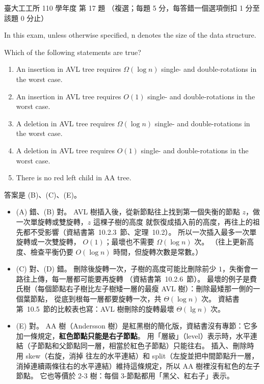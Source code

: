 \begin{pastexam}[label={px:ntu-110-ie-ds-17}]{臺大工工所 110 學年度 第 17 題}
（複選；每題 5 分，每答錯一個選項倒扣 1 分至該題 0 分止）

In this exam, unless otherwise specified, n denotes the size of the data structure.

Which of the following statements are true?
\begin{enumerate}[label=(\Alph*)]
\item An insertion in AVL tree requires $\Omega(\log n)$ single- and double-rotations in the worst case.
\item An insertion in AVL tree requires $O(1)$ single- and double-rotations in the worst case.
\item A deletion in AVL tree requires $\Omega(\log n)$ single- and double-rotations in the worst case.
\item A deletion in AVL tree requires $O(1)$ single- and double-rotations in the worst case.
\item There is no red left child in AA tree.
\end{enumerate}
\end{pastexam}

\begin{pastsoln}
答案是 (B)、(C)、(E)。

\begin{itemize}
\item (A) 錯、(B) 對。 AVL 樹插入後，從新節點往上找到第一個失衡的節點 $z$，做一次單旋轉或雙旋轉，$z$ 這棵子樹的高度
就恢復成插入前的高度，再往上的祖先都不受影響（資結書第~10.2.3~節、定理~10.2）。 所以一次插入最多一次單旋轉或一次雙旋轉，
$O(1)$；最壞也不需要 $\Omega(\log n)$ 次。 （往上更新高度、檢查平衡仍要 $O(\log n)$ 時間，但旋轉次數是常數。）
\item (C) 對、(D) 錯。 刪除後旋轉一次，子樹的高度可能比刪除前少 $1$，失衡會一路往上傳，每一層都可能要再旋轉
（資結書第~10.2.6~節）。 最壞的例子是費氏樹（每個節點右子樹比左子樹矮一層的最瘦 AVL 樹）：刪除最矮那一側的一個葉節點，
從底到根每一層都要旋轉一次，共 $\Theta(\log n)$ 次。 資結書第~10.5~節的比較表也寫：AVL 樹刪除的旋轉最壞 $\Theta(\lg n)$ 次。
\item (E) 對。 AA 樹（Andersson 樹）是紅黑樹的簡化版，資結書沒有專節：它多加一條規定，\textbf{紅色節點只能是右子節點}。
用「層級」（level）表示時，水平連結（子節點和父節點同一層，相當於紅色子節點）只能往右。 插入、刪除時用 skew（右旋，消掉
往左的水平連結）和 split（左旋並把中間節點升一層，消掉連續兩條往右的水平連結）維持這條規定，所以 AA 樹裡沒有紅色的左子節點。
它也等價於 2-3 樹：每個 3-節點都用「黑父、紅右子」表示。
\end{itemize}
\end{pastsoln}
